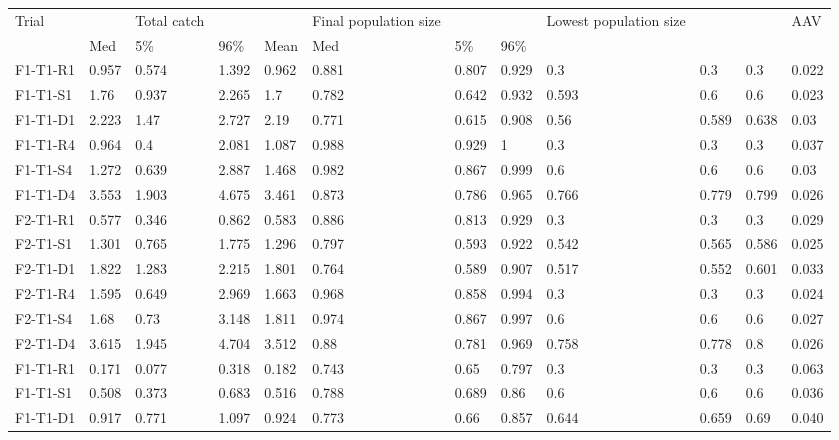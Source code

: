 \begin{table}[ht]
\centering
\begin{tabular}{llllllllllll}
  \hline
  \hline
Trial &  & Total catch &  &  & Final population size &  &  & Lowest population size &  &  & AAV \\ 
   & Med & 5\% & 96\% & Mean & Med & 5\% & 96\% &  &  &  &  \\ 
     F1-T1-R1     & 0.957 & 0.574 & 1.392 & 0.962 & 0.881 & 0.807 & 0.929 & 0.3 & 0.3 & 0.3 & 0.022 \\ 
     F1-T1-S1     & 1.76 & 0.937 & 2.265 & 1.7 & 0.782 & 0.642 & 0.932 & 0.593 & 0.6 & 0.6 & 0.023 \\ 
     F1-T1-D1     & 2.223 & 1.47 & 2.727 & 2.19 & 0.771 & 0.615 & 0.908 & 0.56 & 0.589 & 0.638 & 0.03 \\ 
     F1-T1-R4     & 0.964 & 0.4 & 2.081 & 1.087 & 0.988 & 0.929 & 1 & 0.3 & 0.3 & 0.3 & 0.037 \\ 
     F1-T1-S4     & 1.272 & 0.639 & 2.887 & 1.468 & 0.982 & 0.867 & 0.999 & 0.6 & 0.6 & 0.6 & 0.03 \\ 
     F1-T1-D4     & 3.553 & 1.903 & 4.675 & 3.461 & 0.873 & 0.786 & 0.965 & 0.766 & 0.779 & 0.799 & 0.026 \\ 
     F2-T1-R1     & 0.577 & 0.346 & 0.862 & 0.583 & 0.886 & 0.813 & 0.929 & 0.3 & 0.3 & 0.3 & 0.029 \\ 
     F2-T1-S1     & 1.301 & 0.765 & 1.775 & 1.296 & 0.797 & 0.593 & 0.922 & 0.542 & 0.565 & 0.586 & 0.025 \\ 
     F2-T1-D1     & 1.822 & 1.283 & 2.215 & 1.801 & 0.764 & 0.589 & 0.907 & 0.517 & 0.552 & 0.601 & 0.033 \\ 
     F2-T1-R4     & 1.595 & 0.649 & 2.969 & 1.663 & 0.968 & 0.858 & 0.994 & 0.3 & 0.3 & 0.3 & 0.024 \\ 
     F2-T1-S4     & 1.68 & 0.73 & 3.148 & 1.811 & 0.974 & 0.867 & 0.997 & 0.6 & 0.6 & 0.6 & 0.027 \\ 
     F2-T1-D4     & 3.615 & 1.945 & 4.704 & 3.512 & 0.88 & 0.781 & 0.969 & 0.758 & 0.778 & 0.8 & 0.026 \\ 
     F1-T1-R1     & 0.171 & 0.077 & 0.318 & 0.182 & 0.743 & 0.65 & 0.797 & 0.3 & 0.3 & 0.3 &    0.063  \\ 
     F1-T1-S1     & 0.508 & 0.373 & 0.683 & 0.516 & 0.788 & 0.689 & 0.86 & 0.6 & 0.6 & 0.6 &    0.036  \\ 
     F1-T1-D1     & 0.917 & 0.771 & 1.097 & 0.924 & 0.773 & 0.66 & 0.857 & 0.644 & 0.659 & 0.69 &    0.040  \\ 

\end{tabular}
\end{table}
